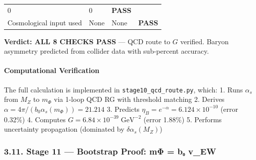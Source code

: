 \documentclass[
  11pt,
]{article}
\begin{document}
\begin{longtable}[]{@{}llll@{}}
\begin{minipage}[t]{0.22\columnwidth}
0\strut
\end{minipage} & \begin{minipage}[t]{0.22\columnwidth}\raggedright
0\strut
\end{minipage} & \begin{minipage}[t]{0.22\columnwidth}\raggedright
\textbf{PASS}\strut
\end{minipage}\tabularnewline
\begin{minipage}[t]{0.22\columnwidth}\raggedright
Cosmological input used\strut
\end{minipage} & \begin{minipage}[t]{0.22\columnwidth}\raggedright
None\strut
\end{minipage} & \begin{minipage}[t]{0.22\columnwidth}\raggedright
None\strut
\end{minipage} & \begin{minipage}[t]{0.22\columnwidth}\raggedright
\textbf{PASS}\strut
\end{minipage}\tabularnewline
\bottomrule
\end{longtable}

\textbf{Verdict: ALL 8 CHECKS PASS} --- QCD route to \(G\) verified.
Baryon asymmetry predicted from collider data with sub-percent accuracy.

\bigskip

\hypertarget{computational-verification}{%
\paragraph{Computational
Verification}\label{computational-verification}}

The full calculation is implemented in \texttt{stage10\_qcd\_route.py},
which: 1. Runs \(\alpha_s\) from \(M_Z\) to \(m_\Phi\) via 1-loop QCD RG
with threshold matching 2. Derives
\(\alpha = 4\pi/(b_0 \alpha_s(m_\Phi)) = 21.214\) 3. Predicts
\(\eta_B = e^{-\alpha} = 6.124 \times 10^{-10}\) (error 0.32\%) 4.
Computes \(G = 6.84 \times 10^{-39}\;\text{GeV}^{-2}\) (error 1.88\%) 5.
Performs uncertainty propagation (dominated by \(\delta\alpha_s(M_Z)\))

\hypertarget{stage-11-bootstrap-proof-mux3c6-bux2080-v_ew}{%
\subsubsection{3.11. Stage 11 --- Bootstrap Proof: mΦ = b₀
v\_EW}\label{stage-11-bootstrap-proof-mux3c6-bux2080-v_ew}}
\end{document}
